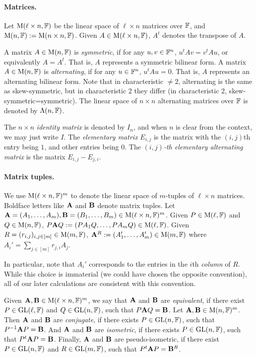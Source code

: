 \documentclass[11pt]{article}
\begin{document}
\paragraph{Matrices.} Let $\mathrm{M}(\ell\times n, \mathbb{F})$ be the linear space of 
$\ell\times n$ matrices over 
$\mathbb{F}$, and $\mathrm{M}(n, \mathbb{F}):=\mathrm{M}(n\times n, \mathbb{F})$. 
Given $A\in \mathrm{M}(\ell\times 
n, \mathbb{F})$, $A^t$ denotes the transpose of $A$. 

A matrix $A\in \mathrm{M}(n, \mathbb{F})$ is \emph{symmetric}, if for any $u, v\in \mathbb{F}^n$, 
$u^tAv=v^tAu$, or equivalently $A = A^t$. 
That is, $A$ represents a symmetric bilinear form. 
A matrix $A\in \mathrm{M}(n, \mathbb{F})$ is \emph{alternating}, if for any $u\in \mathbb{F}^n$, 
$u^tAu=0$. That is, $A$ represents an alternating bilinear form. 
Note that in characteristic $\neq 2$, alternating is the same as 
skew-symmetric, but in characteristic 2 they differ (in characteristic 2, 
skew-symmetric=symmetric). The linear space of $n\times n$ 
alternating matrices over $\mathbb{F}$ is denoted by $\Lambda(n, \mathbb{F})$. 

The $n\times n$ \emph{identity matrix} is 
denoted by $I_n$, and when $n$ is clear from the context, we may just write $I$. 
The \emph{elementary matrix} $E_{i,j}$ is the matrix with the $(i,j)$th entry 
being $1$, 
and other entries being $0$. The \emph{$(i,j)$-th elementary alternating matrix} is the matrix $E_{i,j} - E_{j,i}$.

\paragraph{Matrix tuples.} We use $\mathrm{M}(\ell\times n, \mathbb{F})^{m}$ to denote the linear 
space of $m$-tuples of $\ell\times n$ matrices. Boldface letters like $\mathbf{A}$ and 
$\mathbf{B}$ denote matrix tuples. Let $\mathbf{A}=(A_1, \dots, A_m), \mathbf{B}=(B_1, \dots, B_m)\in 
\mathrm{M}(\ell\times n, \mathbb{F})^m$.  Given $P\in\mathrm{M}(\ell, \mathbb{F})$ and $Q\in\mathrm{M}(n, \mathbb{F})$, $P\mathbf{A} 
Q:=(PA_1Q, \dots, PA_mQ)\in \mathrm{M}(\ell, \mathbb{F})$. Given $R=(r_{i,j})_{i,j\in[m]}\in \mathrm{M}(m, 
\mathbb{F})$, $\mathbf{A}^R:=(A_1', \dots, A_m')\in\mathrm{M}(m,\mathbb{F})$ where 
$A_i'=\sum_{j\in[m]}r_{j, i}A_j$. 
\begin{remark}
In particular, note that $A_i'$ 
corresponds to the entries in the $i$th \emph{column} of $R$. 
While this choice is immaterial (we could have chosen the opposite 
convention), all of our later calculations are consistent with this 
convention.
\end{remark}

Given $\mathbf{A}, \mathbf{B}\in\mathrm{M}(\ell\times n, \mathbb{F})^m$, we say that $\mathbf{A}$ and $\mathbf{B}$ are 
\emph{equivalent}, if there exist $P\in\mathrm{GL}(\ell, \mathbb{F})$ and 
$Q\in\mathrm{GL}(n, \mathbb{F})$, such that $P\mathbf{A} Q=\mathbf{B}$. Let $\mathbf{A}, \mathbf{B}\in\mathrm{M}(n, \mathbb{F})^m$. Then $\mathbf{A}$ 
and $\mathbf{B}$ are \emph{conjugate}, if there exists $P\in\mathrm{GL}(n, \mathbb{F})$, such that 
$P^{-1}\mathbf{A} 
P=\mathbf{B}$. And $\mathbf{A}$ and $\mathbf{B}$ are \emph{isometric}, if there exists $P\in\mathrm{GL}(n, 
\mathbb{F})$, such 
that $P^t\mathbf{A} P=\mathbf{B}$. Finally, $\mathbf{A}$ and $\mathbf{B}$ are pseudo-isometric, if there exist 
$P\in\mathrm{GL}(n, \mathbb{F})$ and $R\in\mathrm{GL}(m, \mathbb{F})$, such that $P^t\mathbf{A} P=\mathbf{B}^R$.
\end{document}
